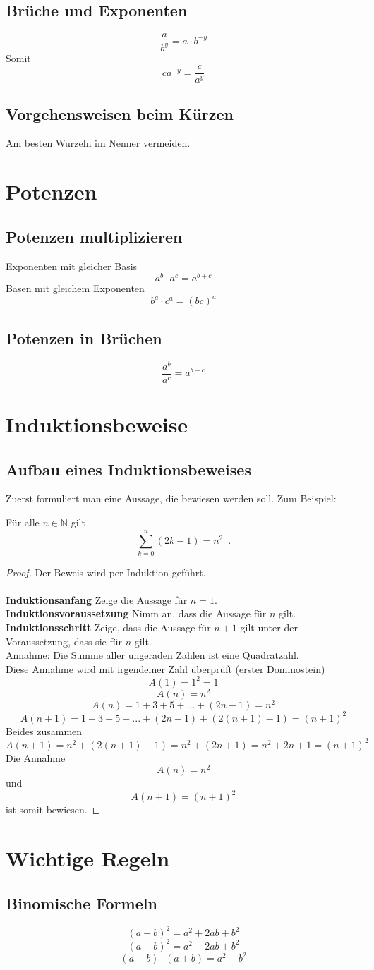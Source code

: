 \documentclass[11pt, a4paper]{article}
\begin{document}
\subsection{Brüche und Exponenten}
\[
	\frac{a}{b^{y}} = a \cdot b^{-y}
\]
Somit
\[
	ca^{-y} = \frac{c}{a^{y}}
\]

\subsection{Vorgehensweisen beim Kürzen}
Am besten Wurzeln im Nenner vermeiden.\\
\section{Potenzen}
\subsection{Potenzen multiplizieren}
Exponenten mit gleicher Basis
\[a^{b} \cdot a^{c} = a^{b + c}\]
Basen mit gleichem Exponenten
\[b^{a} \cdot c^{a} = (bc)^{a}\]
\subsection{Potenzen in Brüchen}
\[\frac{a^{b}}{a^{c}} = a^{b-c}\]
\section{Induktionsbeweise}
\subsection*{Aufbau eines Induktionsbeweises}
Zuerst formuliert man eine Aussage, die bewiesen werden soll. Zum Beispiel:
\begin{satz}
Für alle $n \in \mathbb{N}$ gilt
\[
\sum_{k=0}^{n}(2k-1) = n^{2} \enspace.
\]
\end{satz}
\begin{proof} Der Beweis wird per Induktion geführt.\\\\
\textbf{Induktionsanfang}
Zeige die Aussage für $n=1$.\\
\textbf{Induktionsvoraussetzung}
Nimm an, dass die Aussage für $n$ gilt.\\
\textbf{Induktionsschritt}
Zeige, dass die Aussage für $n+1$ gilt unter der Voraussetzung, dass sie für $n$ gilt.\\
Annahme: Die Summe aller ungeraden Zahlen ist eine Quadratzahl.\\
Diese Annahme wird mit irgendeiner Zahl überprüft (erster Dominostein)
\[A(1) = 1^{2} = 1\]
\[A(n) = n^{2}\]
\[A(n) = 1+3+5+ ... + (2n-1) = n^{2}\]
\[A(n+1) = 1+3+5+ ... + (2n-1) + (2(n+1)-1) = (n+1)^{2}\]
Beides zusammen
\[A(n+1) = n^{2} + (2(n+1)-1) = n^{2} + (2n+1) = n^{2} + 2n + 1 = (n+1)^{2}\]
Die Annahme
\[A(n) = n^{2}\]
und
\[A(n+1) = (n+1)^{2}\]
ist somit bewiesen.
\end{proof}

\section{Wichtige Regeln}
\subsection{Binomische Formeln}
\[(a+b)^{2} = a^{2} + 2ab + b^{2}\]
\[(a-b)^{2} = a^{2} - 2ab + b^{2}\]
\[(a-b)\cdot(a+b) = a^{2}-b^{2}\]
\end{document}
